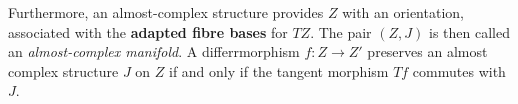 Furthermore, an almost-complex structure provides $Z$ with an orientation, associated with the \textbf{adapted fibre bases} for $TZ$. 
The pair $(Z,J)$ is then called an \textit{almost-complex manifold}. A differrmorphism $f: Z \rightarrow Z'$ preserves an almost complex structure $J$ on $Z$ if and only if the tangent morphism $Tf$ commutes with $J$. \medbreak






